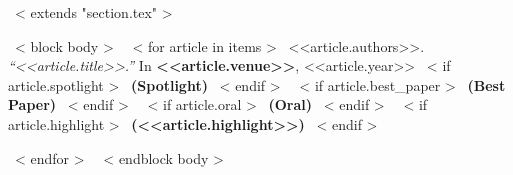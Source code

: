 ~< extends "section.tex" >~

~< block body >~
  ~< for article in items >~
    <<article.authors>>. {\it``<<article.title>>.''} In {\bf <<article.venue>>}, <<article.year>>
    ~< if article.spotlight >~
      {\bf {\color{red}(Spotlight)}}
    ~< endif >~
    ~< if article.best_paper >~
      {\bf {\color{red}(Best Paper)}}
    ~< endif >~
    ~< if article.oral >~
      {\bf {\color{red}(Oral)}}
    ~< endif >~
    ~< if article.highlight >~
      {\bf {\color{red}(<<article.highlight>>)}}
    ~< endif >~

  ~< endfor >~
~< endblock body >~
